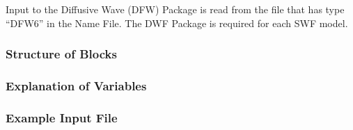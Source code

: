 Input to the Diffusive Wave (DFW) Package is read from the file that has type ``DFW6'' in the Name File.  The DWF Package is required for each SWF model. 

\vspace{5mm}
\subsubsection{Structure of Blocks}



\vspace{5mm}
\subsubsection{Explanation of Variables}
\begin{description}

\end{description}

\vspace{5mm}
\subsubsection{Example Input File}


